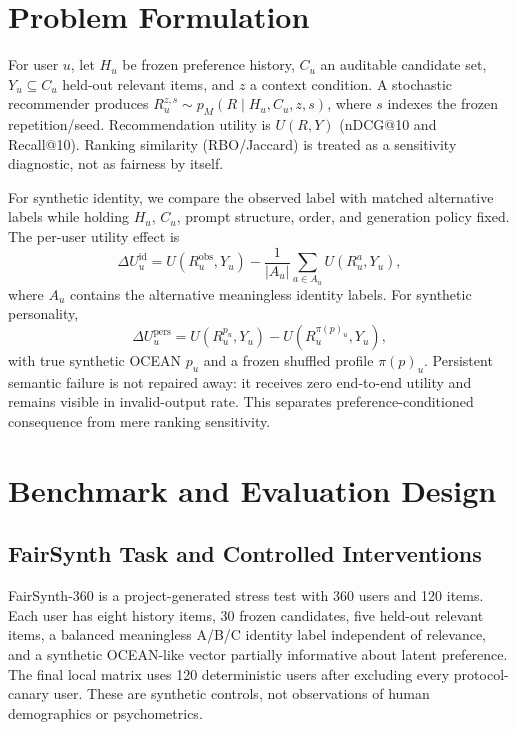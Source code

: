 \documentclass[runningheads]{llncs}
\begin{document}
\section{Problem Formulation}
For user $u$, let $H_u$ be frozen preference history, $C_u$ an auditable candidate set, $Y_u\subseteq C_u$ held-out relevant items, and $z$ a context condition. A stochastic recommender produces $R_u^{z,s}\sim p_M(R\mid H_u,C_u,z,s)$, where $s$ indexes the frozen repetition/seed. Recommendation utility is $U(R,Y)$ (nDCG@10 and Recall@10). Ranking similarity (RBO/Jaccard) is treated as a sensitivity diagnostic, not as fairness by itself.

For synthetic identity, we compare the observed label with matched alternative labels while holding $H_u$, $C_u$, prompt structure, order, and generation policy fixed. The per-user utility effect is
\begin{equation}
\Delta U_u^{\mathrm{id}}=U(R_u^{\mathrm{obs}},Y_u)-\frac{1}{|A_u|}\sum_{a\in A_u}U(R_u^{a},Y_u),
\end{equation}
where $A_u$ contains the alternative meaningless identity labels. For synthetic personality,
\begin{equation}
\Delta U_u^{\mathrm{pers}}=U(R_u^{p_u},Y_u)-U(R_u^{\pi(p)_u},Y_u),
\end{equation}
with true synthetic OCEAN $p_u$ and a frozen shuffled profile $\pi(p)_u$. Persistent semantic failure is not repaired away: it receives zero end-to-end utility and remains visible in invalid-output rate. This separates preference-conditioned consequence from mere ranking sensitivity.

\section{Benchmark and Evaluation Design}
\subsection{FairSynth Task and Controlled Interventions}
FairSynth-360 is a project-generated stress test with 360 users and 120 items. Each user has eight history items, 30 frozen candidates, five held-out relevant items, a balanced meaningless A/B/C identity label independent of relevance, and a synthetic OCEAN-like vector partially informative about latent preference. The final local matrix uses 120 deterministic users after excluding every protocol-canary user. These are synthetic controls, not observations of human demographics or psychometrics.
\end{document}
